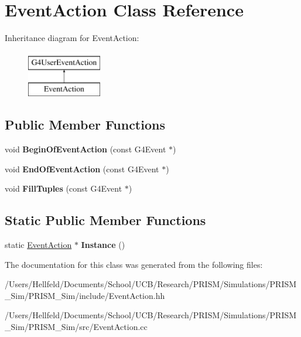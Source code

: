 \hypertarget{class_event_action}{}\section{Event\+Action Class Reference}
\label{class_event_action}
Inheritance diagram for Event\+Action\+:\begin{figure}[H]
\begin{center}
\leavevmode
\includegraphics[height=2.000000cm]{class_event_action}
\end{center}
\end{figure}
\subsection*{Public Member Functions}
\begin{DoxyCompactItemize}
\item 
\hypertarget{class_event_action_a367abec1f640a4354f9b69e2e36e015d}{}\label{class_event_action_a367abec1f640a4354f9b69e2e36e015d} 
void {\bfseries Begin\+Of\+Event\+Action} (const G4\+Event $\ast$)
\item 
\hypertarget{class_event_action_acbb14da7b112e47ec22a253d4aa7dd4f}{}\label{class_event_action_acbb14da7b112e47ec22a253d4aa7dd4f} 
void {\bfseries End\+Of\+Event\+Action} (const G4\+Event $\ast$)
\item 
\hypertarget{class_event_action_a3d7dc3c32f0129da5d033e5bffb8a3b2}{}\label{class_event_action_a3d7dc3c32f0129da5d033e5bffb8a3b2} 
void {\bfseries Fill\+Tuples} (const G4\+Event $\ast$)
\end{DoxyCompactItemize}
\subsection*{Static Public Member Functions}
\begin{DoxyCompactItemize}
\item 
\hypertarget{class_event_action_ad3e01c4c2a8e586370bda7797fcb2e38}{}\label{class_event_action_ad3e01c4c2a8e586370bda7797fcb2e38} 
static \hyperlink{class_event_action}{Event\+Action} $\ast$ {\bfseries Instance} ()
\end{DoxyCompactItemize}


The documentation for this class was generated from the following files\+:\begin{DoxyCompactItemize}
\item 
/\+Users/\+Hellfeld/\+Documents/\+School/\+U\+C\+B/\+Research/\+P\+R\+I\+S\+M/\+Simulations/\+P\+R\+I\+S\+M\+\_\+\+Sim/\+P\+R\+I\+S\+M\+\_\+\+Sim/include/Event\+Action.\+hh\item 
/\+Users/\+Hellfeld/\+Documents/\+School/\+U\+C\+B/\+Research/\+P\+R\+I\+S\+M/\+Simulations/\+P\+R\+I\+S\+M\+\_\+\+Sim/\+P\+R\+I\+S\+M\+\_\+\+Sim/src/Event\+Action.\+cc\end{DoxyCompactItemize}
